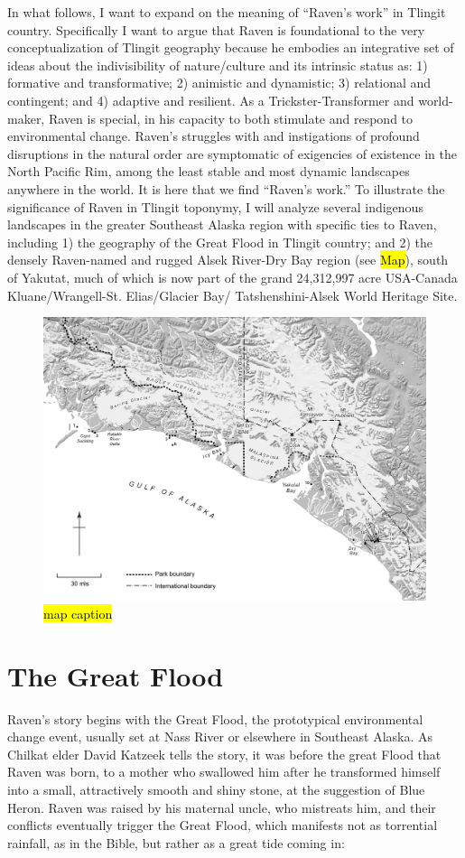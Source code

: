 In what follows, I want to expand on the meaning of “Raven’s work” in Tlingit country. Specifically I want to argue that Raven is foundational to the very conceptualization of Tlingit geography because he embodies an integrative set of ideas about the indivisibility of nature/culture and its intrinsic status as: 1) formative and transformative; 2) animistic and dynamistic; 3) relational and contingent; and 4) adaptive and resilient.  As a Trickster-Transformer and world-maker, Raven is special, in his capacity to both stimulate and respond to environmental change.  Raven’s struggles with  and instigations of profound disruptions in the natural order are symptomatic of exigencies of existence in the North Pacific Rim, among the least stable and most dynamic landscapes anywhere in the world.  It is here that we find “Raven’s work.” To illustrate the significance of Raven in Tlingit toponymy, I will analyze several indigenous landscapes in the greater Southeast Alaska region with specific ties to Raven, including 1) the geography of the Great Flood in Tlingit country; and 2) the densely Raven-named and rugged Alsek River-Dry Bay region (see \hl{Map}), south of Yakutat, much of which is now part of the grand 24,312,997 acre USA-Canada Kluane/Wrangell-St. Elias/Glacier Bay/ Tatshenshini-Alsek World Heritage Site.

\begin{figure}
	\includegraphics{figures/thornton-map1}
	\caption{\hl{map caption}}
	\label{thornton-map1}	
\end{figure}

\section{The Great Flood}
	Raven’s story begins with the Great Flood, the prototypical environmental change event, usually set at Nass River or elsewhere in Southeast Alaska.  As Chilkat elder David Katzeek tells the story, it was before the great Flood that Raven was born, to a mother who swallowed him after he transformed himself into a small, attractively smooth and shiny stone, at the suggestion of Blue Heron.  Raven was raised by his maternal uncle, who mistreats him, and their conflicts eventually trigger the Great Flood, which manifests not as torrential rainfall, as in the Bible, but rather as a great tide coming in:


